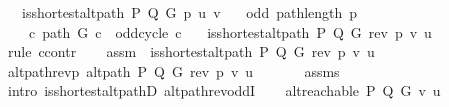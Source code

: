 \begin{isabellebody}
\ \ \ {\isachardoublequoteopen}is{\isacharunderscore}{\kern0pt}shortest{\isacharunderscore}{\kern0pt}alt{\isacharunderscore}{\kern0pt}path\ P\ Q\ G\ p\ u\ v{\isachardoublequoteclose}\isanewline
\ \ \ {\isachardoublequoteopen}odd\ {\isacharparenleft}{\kern0pt}path{\isacharunderscore}{\kern0pt}length\ p{\isacharparenright}{\kern0pt}{\isachardoublequoteclose}\isanewline
\ \ \ {\isachardoublequoteopen}{\isasymnot}\ {\isacharparenleft}{\kern0pt}{\isasymexists}c{\isachardot}{\kern0pt}\ path\ G\ c\ {\isasymand}\ odd{\isacharunderscore}{\kern0pt}cycle\ c{\isacharparenright}{\kern0pt}{\isachardoublequoteclose}\isanewline
\ \ \ {\isachardoublequoteopen}is{\isacharunderscore}{\kern0pt}shortest{\isacharunderscore}{\kern0pt}alt{\isacharunderscore}{\kern0pt}path\ P\ Q\ G\ {\isacharparenleft}{\kern0pt}rev\ p{\isacharparenright}{\kern0pt}\ v\ u{\isachardoublequoteclose}%
\endisataginvisible
{\isafoldinvisible}%
%
\isadeliminvisible
\isanewline
%
\endisadeliminvisible
%
\isadelimproof
%
\endisadelimproof
%
\isatagproof
{}\isamarkupfalse%
\ {\isacharparenleft}{\kern0pt}rule\ ccontr{\isacharparenright}{\kern0pt}\isanewline
\ \ \isamarkupfalse%
\ assm{\isacharcolon}{\kern0pt}\ {\isachardoublequoteopen}{\isasymnot}\ is{\isacharunderscore}{\kern0pt}shortest{\isacharunderscore}{\kern0pt}alt{\isacharunderscore}{\kern0pt}path\ P\ Q\ G\ {\isacharparenleft}{\kern0pt}rev\ p{\isacharparenright}{\kern0pt}\ v\ u{\isachardoublequoteclose}\isanewline
\ \ \isamarkupfalse%
\ alt{\isacharunderscore}{\kern0pt}path{\isacharunderscore}{\kern0pt}rev{\isacharunderscore}{\kern0pt}p{\isacharcolon}{\kern0pt}\ {\isachardoublequoteopen}alt{\isacharunderscore}{\kern0pt}path\ P\ Q\ G\ {\isacharparenleft}{\kern0pt}rev\ p{\isacharparenright}{\kern0pt}\ v\ u\ {\isachardoublequoteclose}\isanewline
\ \ \ \ \isamarkupfalse%
\ assms{\isacharparenleft}{\kern0pt}{}{\isacharcomma}{\kern0pt}\ {}{\isacharparenright}{\kern0pt}\isanewline
\ \ \ \ \isamarkupfalse%
\ {\isacharparenleft}{\kern0pt}intro\ is{\isacharunderscore}{\kern0pt}shortest{\isacharunderscore}{\kern0pt}alt{\isacharunderscore}{\kern0pt}pathD{\isacharparenleft}{\kern0pt}{}{\isacharparenright}{\kern0pt}\ alt{\isacharunderscore}{\kern0pt}path{\isacharunderscore}{\kern0pt}rev{\isacharunderscore}{\kern0pt}oddI{\isacharparenright}{\kern0pt}\isanewline
\ \ \isamarkupfalse%
\ {\isachardoublequoteopen}alt{\isacharunderscore}{\kern0pt}reachable\ P\ Q\ G\ v\ u{\isachardoublequoteclose}\isanewline

\end{isabellebody}
